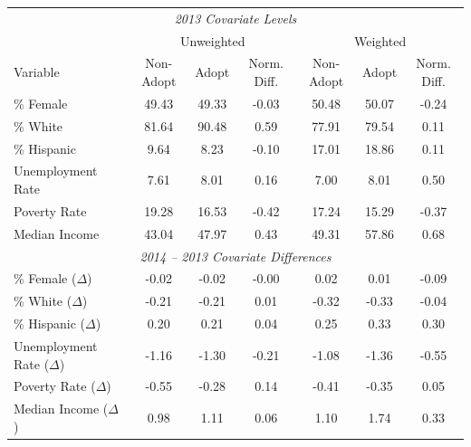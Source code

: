 \begin{tabular}{l*{6}{c}} \\
\hline\hline
\multicolumn{7}{c}{\textit{2013 Covariate Levels}} \\
& \multicolumn{3}{c}{Unweighted} & \multicolumn{3}{c}{Weighted} \\
Variable & Non-Adopt & Adopt & Norm. Diff. & Non-Adopt & Adopt & Norm. Diff. \\
\hline
\% Female & 49.43 & 49.33 & -0.03 & 50.48 & 50.07 & -0.24 \\
\% White & 81.64 & 90.48 & 0.59 & 77.91 & 79.54 & 0.11 \\
\% Hispanic & 9.64 & 8.23 & -0.10 & 17.01 & 18.86 & 0.11 \\
Unemployment Rate & 7.61 & 8.01 & 0.16 & 7.00 & 8.01 & 0.50 \\
Poverty Rate & 19.28 & 16.53 & -0.42 & 17.24 & 15.29 & -0.37 \\
Median Income & 43.04 & 47.97 & 0.43 & 49.31 & 57.86 & 0.68 \\
\hline
\multicolumn{7}{c}{\textit{2014 -- 2013 Covariate Differences}} \\
\% Female ($\Delta$) & -0.02 & -0.02 & -0.00 & 0.02 & 0.01 & -0.09 \\
\% White ($\Delta$) & -0.21 & -0.21 & 0.01 & -0.32 & -0.33 & -0.04 \\
\% Hispanic ($\Delta$) & 0.20 & 0.21 & 0.04 & 0.25 & 0.33 & 0.30 \\
Unemployment Rate ($\Delta$) & -1.16 & -1.30 & -0.21 & -1.08 & -1.36 & -0.55 \\
Poverty Rate ($\Delta$) & -0.55 & -0.28 & 0.14 & -0.41 & -0.35 & 0.05 \\
Median Income ($\Delta$) & 0.98 & 1.11 & 0.06 & 1.10 & 1.74 & 0.33 \\
\hline\hline
\end{tabular}
